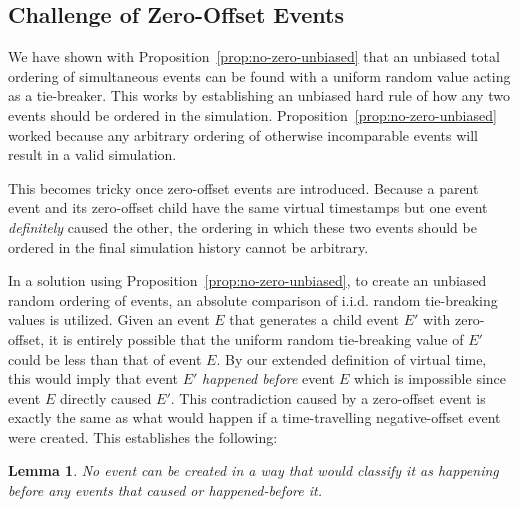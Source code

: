 \documentclass[nonacm,sigconf]{acmart}
\newtheorem{lemma}{Lemma}
\begin{document}

\subsection{Challenge of Zero-Offset Events} \label{sec:zero-offset-challenge}
We have shown with Proposition~\ref{prop:no-zero-unbiased} that an unbiased total ordering of simultaneous events can be found with a uniform random value acting as a tie-breaker. This works by establishing an unbiased hard rule of how any two events should be ordered in the simulation. Proposition~\ref{prop:no-zero-unbiased} worked because any arbitrary ordering of otherwise incomparable events will result in a valid simulation.

This becomes tricky once zero-offset events are introduced. Because a parent event and its zero-offset child have the same virtual timestamps but one event \emph{definitely} caused the other, the ordering in which these two events should be ordered in the final simulation history cannot be arbitrary. 

In a solution using Proposition~\ref{prop:no-zero-unbiased}, to create an unbiased random ordering of events, an absolute comparison of i.i.d. random tie-breaking values is utilized. Given an event $E$ that generates a child event $E'$ with zero-offset, it is entirely possible that the uniform random tie-breaking value of $E'$ could be less than that of event $E$. By our extended definition of virtual time, this would imply that event $E'$ \emph{happened before} event $E$ which is impossible since event $E$ directly caused $E'$. This contradiction caused by a zero-offset event is exactly the same as what would happen if a time-travelling negative-offset event were created. This establishes the following:

\begin{lemma}\label{lem:causal-guarantee}
  No event can be created in a way that would classify it as happening before any events that caused or happened-before it.
\end{lemma}
\end{document}

